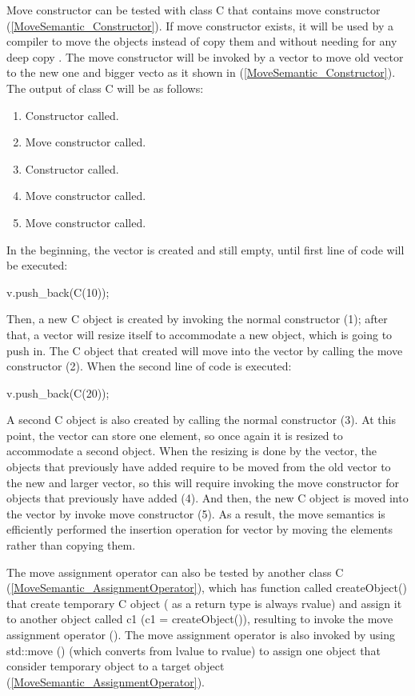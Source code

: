 \documentclass[11pt]{report}
\begin{document}
Move constructor can be tested with class C that contains move constructor (\ref{MoveSemantic_Constructor}). If move constructor exists, it will be used by a compiler to move the objects instead of copy them and without needing for any deep copy \cite{MSDN:2012:CppModern}. The move constructor will be invoked by a vector to move old vector to the new one and bigger vecto as it shown in (\ref{MoveSemantic_Constructor}). The output of class C will be as follows:

\begin{enumerate}
\item Constructor called.
\item Move constructor called.
\item Constructor called.
\item Move constructor called.
\item Move constructor called.
\end{enumerate}

In the beginning, the vector is created and still empty, until first line of code will be executed:
\begin{center}
v.push\_back(C(10));
\end{center} 

Then, a new C object is created by invoking the normal constructor (1); after that, a vector will resize itself to accommodate a new object, which is going to push in. The C object that created will move into the vector by calling the move constructor (2). When the second line of code is executed:
\begin{center}
v.push\_back(C(20));
\end{center}

A second C object is also created by calling the normal constructor (3). At this point, the vector can store one element, so once again it is resized to accommodate a second object. When the resizing is done by the vector, the objects that previously have added require to be moved from the old vector to the new and larger vector, so this will require invoking the move constructor for objects that previously have added (4). And then, the new C object is moved into the vector by invoke move constructor (5). As a result, the move semantics is efficiently performed the insertion operation for vector by moving the elements rather than copying them.

The move assignment operator can also be tested by another class C (\ref{MoveSemantic_AssignmentOperator}), which has function called createObject() that create temporary C object ( as a return type is always rvalue) and assign it to another object called c1  (c1 = createObject()), resulting to invoke the move assignment operator (\cite{Gregorie:professionalcpp}). The move assignment operator is also invoked by using std::move () (which converts from lvalue to rvalue) to assign one object that consider temporary object to a target object (\ref{MoveSemantic_AssignmentOperator}).
\end{document}
